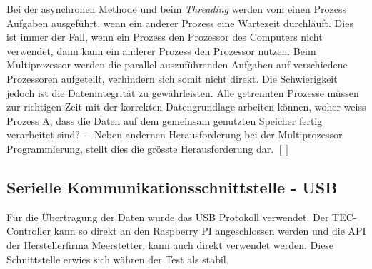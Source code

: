 Bei der asynchronen Methode und beim \textit{Threading} werden vom einen Prozess Aufgaben ausgeführt, wenn ein anderer Prozess eine Wartezeit durchläuft. Dies ist immer der Fall, wenn ein Prozess den Prozessor des Computers nicht verwendet, dann kann ein anderer Prozess den Prozessor nutzen. Beim Multiprozessor werden die parallel auszuführenden Aufgaben auf verschiedene Prozessoren aufgeteilt, verhindern sich somit nicht direkt. Die Schwierigkeit jedoch ist die Datenintegrität zu gewährleisten. Alle getrennten Prozesse müssen zur richtigen Zeit mit der korrekten Datengrundlage arbeiten können, woher weiss Prozess A, dass die Daten auf dem gemeinsam genutzten Speicher fertig verarbeitet sind? $-$ Neben andernen Herausforderung bei der Multiprozessor Programmierung, stellt dies die grösste Herausforderung dar. $[]$


\subsection{Serielle Kommunikationsschnittstelle - USB}
Für die Übertragung der Daten wurde das USB Protokoll verwendet. Der TEC-Controller kann so direkt an den Raspberry PI angeschlossen werden und die API der Herstellerfirma Meerstetter, kann auch direkt verwendet werden. Diese Schnittstelle erwies sich währen der Test als stabil.

\nocite{*}